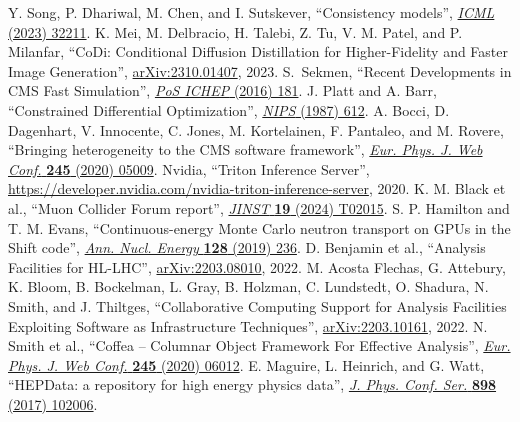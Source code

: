 \begin{thebibliography}{99}
 Y. Song, P. Dhariwal, M. Chen, and I. Sutskever, ``Consistency models'', \href{https://dl.acm.org/doi/10.5555/3618408.3619743}{\textit{ICML} (2023) 32211}.
 K. Mei, M. Delbracio, H. Talebi, Z. Tu, V. M. Patel, and P. Milanfar, ``CoDi: Conditional Diffusion Distillation for Higher-Fidelity and Faster Image Generation'', \href{https://arxiv.org/abs/2310.01407}{arXiv:2310.01407}, 2023.
 S.~Sekmen, ``Recent Developments in CMS Fast Simulation'', \href{https://doi.org/10.22323/1.282.0181}{\textit{PoS ICHEP} (2016) 181}.
 J. Platt and A. Barr, ``Constrained Differential Optimization'', \href{https://proceedings.neurips.cc/paper/1987/hash/a87ff679a2f3e71d9181a67b7542122c-Abstract.html}{\textit{NIPS} (1987) 612}.
 A. Bocci, D. Dagenhart, V. Innocente, C. Jones, M. Kortelainen, F. Pantaleo, and M. Rovere, ``Bringing heterogeneity to the CMS software framework'', \href{https://doi.org/10.1051/epjconf/202024505009}{\textit{Eur. Phys. J. Web Conf.} \textbf{245} (2020) 05009}.
 Nvidia, ``Triton Inference Server'', \href{https://developer.nvidia.com/nvidia-triton-inference-server}{https://developer.nvidia.com/nvidia-triton-inference-server}, 2020.
 K. M. Black et al., ``Muon Collider Forum report'', \href{https://doi.org/10.1088/1748-0221/19/02/T02015}{\textit{JINST} \textbf{19} (2024) T02015}.
 S. P. Hamilton and T. M. Evans, ``Continuous-energy Monte Carlo neutron transport on GPUs in the Shift code'', \href{https://doi.org/10.1016/j.anucene.2019.01.012}{\textit{Ann. Nucl. Energy} \textbf{128} (2019) 236}.
 D. Benjamin et al., ``Analysis Facilities for HL-LHC'', \href{https://arxiv.org/abs/2203.08010}{arXiv:2203.08010}, 2022.
 M. Acosta Flechas, G. Attebury, K. Bloom, B. Bockelman, L. Gray, B. Holzman, C. Lundstedt, O. Shadura, N. Smith, and J. Thiltges, ``Collaborative Computing Support for Analysis Facilities Exploiting Software as Infrastructure Techniques'', \href{https://arxiv.org/abs/2203.10161}{arXiv:2203.10161}, 2022.
 N. Smith et al., ``Coffea -- Columnar Object Framework For Effective Analysis'', \href{https://doi.org/10.1051/epjconf/202024506012}{\textit{Eur. Phys. J. Web Conf.} \textbf{245} (2020) 06012}.
 E. Maguire, L. Heinrich, and G. Watt, ``HEPData: a repository for high energy physics data'', \href{https://doi.org/10.1088/1742-6596/898/10/102006}{\textit{J. Phys. Conf. Ser.} \textbf{898} (2017) 102006}.

\end{thebibliography}
